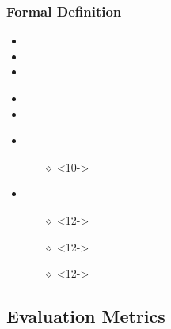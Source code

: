 \documentclass{beamer}
\begin{document}
\begin{frame}
	\frametitle{Formal Definition}
	
	\begin{itemize}
		\item <3-> 
		\item <4-> 
		\item <5-> 
	\end{itemize}
	\begin{itemize}
		\item <7-> 
		\item <8-> 
	\end{itemize} 
	
	\begin{itemize}
		\item <10-> 
		\begin{itemize}
			\item [$\diamond$]<10->
		\end{itemize}
		\item <11-> 
		\begin{itemize}
			\item [$\diamond$]<12-> 
			\item [$\diamond$]<12-> 
			\item [$\diamond$]<12->
		\end{itemize}
	\end{itemize}
	
\end{frame}


\subsection{Evaluation Metrics} %
\end{document}
